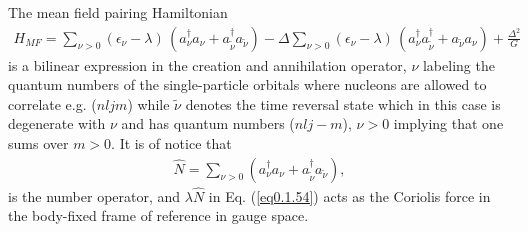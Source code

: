\documentclass[a4paper,11pt]{book}
\numberwithin{equation}{section}
\numberwithin{figure}{section}
\numberwithin{table}{section}
\begin{document}
 The mean field pairing Hamiltonian 
\begin{align}\label{eq0.1.54}
H_{MF}=\sum_{\nu>0}(\epsilon_\nu-\lambda)\,(a^\dagger_\nu a_\nu+a^\dagger_{\tilde\nu} a_{\tilde\nu})-\Delta\sum_{\nu>0}(\epsilon_\nu-\lambda)\,(a^\dagger_\nu a^\dagger_{\tilde\nu}+a_{\tilde\nu} a_{\nu})+\frac{\Delta^2}{G}
\end{align}
is a bilinear expression in the creation and annihilation operator, $\nu$ labeling the quantum numbers of the single-particle orbitals where nucleons are allowed to correlate e.g. ($nljm$) while $\tilde \nu$ denotes the time reversal state which in this case is degenerate with $\nu$ and has quantum numbers ($nlj-m$), $\nu>0$ implying that one sums over $m>0$. It is of notice that 
\begin{align}\label{eq0.1.55}
\hat N=\sum_{\nu>0}(a^\dagger_\nu a_\nu+a^\dagger_{\tilde\nu} a_{\tilde\nu}),
\end{align}
is the number operator, and $\lambda \hat N$ in Eq. (\ref{eq0.1.54}) acts as the Coriolis force in the body-fixed frame of reference in gauge space. 
\end{document}
